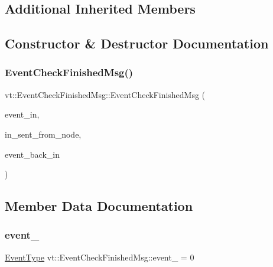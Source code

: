 \subsection*{Additional Inherited Members}


\subsection{Constructor \& Destructor Documentation}
\mbox{\label{structvt_1_1_event_check_finished_msg_ad951266e624f0bafb5e0995470a7a2ff}} 
\subsubsection{\texorpdfstring{Event\+Check\+Finished\+Msg()}{EventCheckFinishedMsg()}}
{\footnotesize\ttfamily vt\+::\+Event\+Check\+Finished\+Msg\+::\+Event\+Check\+Finished\+Msg (\begin{DoxyParamCaption}\item[{\hyperlink{namespacevt_a009267401def7ae8bf201892222d060f}{Event\+Type} const \&}]{event\+\_\+in,  }\item[{\hyperlink{namespacevt_a866da9d0efc19c0a1ce79e9e492f47e2}{Node\+Type} const \&}]{in\+\_\+sent\+\_\+from\+\_\+node,  }\item[{\hyperlink{namespacevt_a009267401def7ae8bf201892222d060f}{Event\+Type} const \&}]{event\+\_\+back\+\_\+in }\end{DoxyParamCaption})\hspace{0.3cm}{\ttfamily [inline]}}



\subsection{Member Data Documentation}
\mbox{\label{structvt_1_1_event_check_finished_msg_afd40f61945ff804339310a0f062c20eb}} 
\subsubsection{\texorpdfstring{event\+\_\+}{event\_}}
{\footnotesize\ttfamily \hyperlink{namespacevt_a009267401def7ae8bf201892222d060f}{Event\+Type} vt\+::\+Event\+Check\+Finished\+Msg\+::event\+\_\+ = 0}

